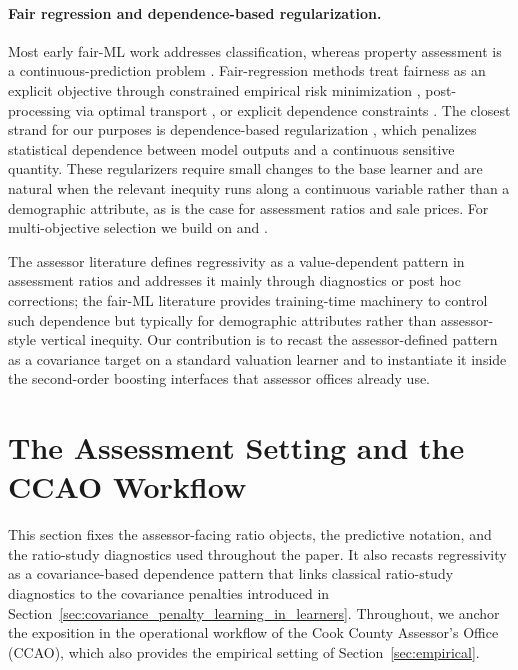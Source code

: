 \documentclass{article}
\theoremstyle{plain}
\theoremstyle{definition}
\newcommand{\1}{\mathbf{1}}
\begin{document}
\paragraph{Fair regression and dependence-based regularization.}
Most early fair-ML work addresses classification, whereas property assessment is a continuous-prediction problem \cite{CatonHaas2024,BarocasHardtNarayanan2023}. Fair-regression methods treat fairness as an explicit objective through constrained empirical risk minimization \cite{AgarwalDudikWu2019,FitzsimonsEtAl2019,WeiEtAl2023}, post-processing via optimal transport \cite{ChzhenEtAl2020Wasserstein,ChzhenEtAl2020Recalibration}, or explicit dependence constraints \cite{KomiyamaEtAl2018,ScutariPaneroProissl2022}. The closest strand for our purposes is dependence-based regularization \cite{MaryEtAl2019,PerezSuayEtAl2017,LiEtAl2022Fairness,lee2022maximal,BuylDefranceDeBie2024FAIRRET}, which penalizes statistical dependence between model outputs and a continuous sensitive quantity. These regularizers require small changes to the base learner and are natural when the relevant inequity runs along a continuous variable rather than a demographic attribute, as is the case for assessment ratios and sale prices. For multi-objective selection we build on \textcite{martinez2020minimax} and \textcite{little2022fairness}.

The assessor literature defines regressivity as a value-dependent pattern in assessment ratios and addresses it mainly through diagnostics or post hoc corrections; the fair-ML literature provides training-time machinery to control such dependence but typically for demographic attributes rather than assessor-style vertical inequity. Our contribution is to recast the assessor-defined pattern as a covariance target on a standard valuation learner and to instantiate it inside the second-order boosting interfaces that assessor offices already use.


\section{The Assessment Setting and the CCAO Workflow}
\label{sec:problem_setting}

This section fixes the assessor-facing ratio objects, the predictive notation, and the ratio-study diagnostics used throughout the paper. It also recasts regressivity as a covariance-based dependence pattern that links classical ratio-study diagnostics to the covariance penalties introduced in Section~\ref{sec:covariance_penalty_learning_in_learners}. Throughout, we anchor the exposition in the operational workflow of the Cook County Assessor's Office (CCAO), which also provides the empirical setting of Section~\ref{sec:empirical}.
\end{document}
